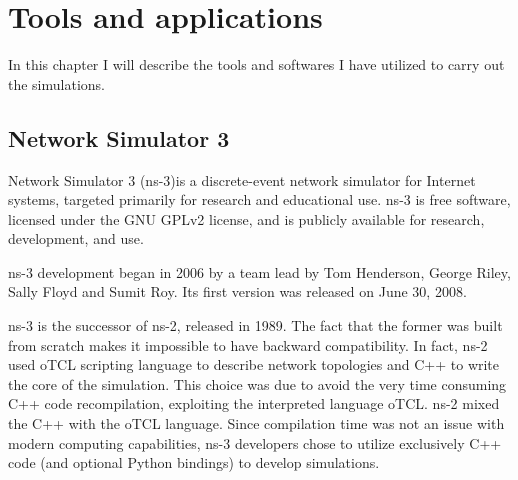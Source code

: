 
\chapter{Tools and applications}
	In this chapter I will describe the tools and softwares I have utilized to carry out the simulations.
	
	\section{Network Simulator 3}
	Network Simulator 3 (ns-3)is a discrete-event network simulator for Internet systems, targeted primarily for research and educational use. ns-3 is free software, licensed under the GNU GPLv2 license, and is publicly available for research, development, and use.
	
	
	ns-3 development began in 2006 by a team lead by Tom Henderson, George Riley, Sally Floyd and Sumit Roy. Its first version was released on June 30, 2008. 
	
	
	ns-3 is the successor of ns-2, released in 1989. The fact that the former was built from scratch makes it impossible to have backward compatibility. In fact, ns-2 used oTCL scripting language to describe network topologies and C++ to write the core of the simulation. This choice was due to avoid the very time consuming C++ code recompilation, exploiting the interpreted language oTCL. ns-2 mixed the  C++ with the  oTCL language. Since compilation time was not an issue with modern computing capabilities, ns-3 developers chose to utilize exclusively C++ code (and optional Python bindings) to develop simulations.
	
%	

%	



